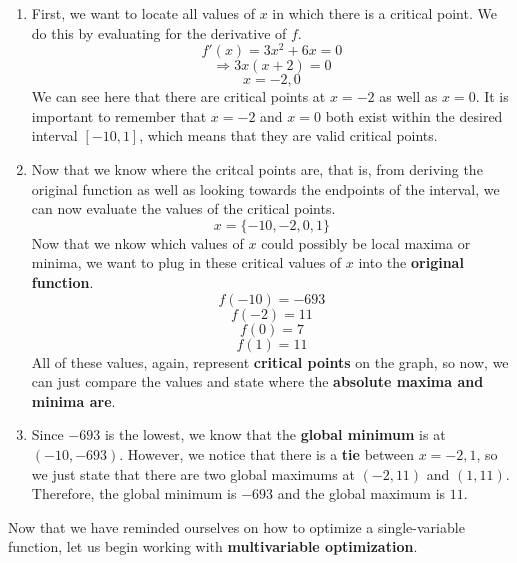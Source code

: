 \documentclass{report}
\begin{document}
\begin{sloppypar}
\sol
\begin{enumerate}
  \item First, we want to locate all values of
        $ x $ in which there is a critical point.
        We do this by evaluating for the derivative
        of $ f$.
        \[ f'(x) = 3x^{2} + 6x = 0 \]
        \[ \Rightarrow 3x(x+2) = 0 \]
        \[ x = -2, 0\]
        We can see here that there are critical points
        at $ x = -2$ as well as $ x = 0 $. It is
        important to remember that $ x = -2$ and
        $ x = 0 $ both exist within the desired
        interval $ [-10,1]$, which means that
        they are valid critical points.
  \item Now that we know where the critcal
        points are, that is, from deriving
        the original function as well as
        looking towards the endpoints of the interval,
        we can now evaluate the
        values of the critical points.
        \[ x = \{-10, -2, 0, 1\}\]
        Now that we nkow which values of $ x $
        could possibly be local maxima or minima,
        we want to plug in these critical values
        of $ x $ into the \textbf{original function}.
        \[ f(-10) = -693 \]
        \[ f(-2) = 11\]
        \[ f(0) = 7 \]
        \[ f(1) = 11 \]
        All of these values, again, represent
        \textbf{critical points} on the graph,
        so now, we can just compare the values
        and state where the \textbf{absolute maxima
        and minima are}.
  \item Since $ -693$ is the lowest, we know
        that the \textbf{global minimum} is at
        $ (-10, -693)$. However, we notice
        that there is a \textbf{tie} between
        $ x = -2, 1$, so we just state
        that there are two global maximums
        at $ (-2, 11)$ and $ (1,11)$. Therefore,
        the global minimum is $-693$ and the
        global maximum is $ 11 $.

\end{enumerate}

Now that we have reminded ourselves on how
to optimize a single-variable function, let us
begin working with \textbf{multivariable optimization}.

\end{sloppypar}
\end{document}
